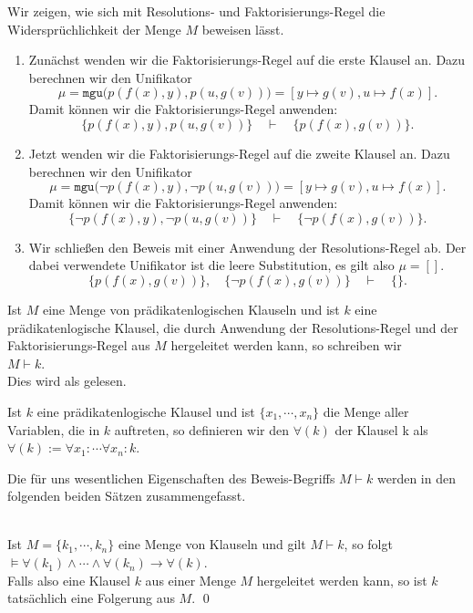 \noindent
Wir zeigen, wie sich mit Resolutions- und Faktorisierungs-Regel die Widersprüchlichkeit
der Menge $M$ beweisen lässt.
\begin{enumerate}
\item Zunächst wenden wir die Faktorisierungs-Regel auf die erste Klausel an. 
      Dazu berechnen wir den Unifikator 
      \[ \mu = \mathtt{mgu}\bigl(p(f(x),y), p(u,g(v))\bigr) = [y \mapsto g(v), u \mapsto f(x)]. \]
      Damit können wir die Faktorisierungs-Regel anwenden: 
      \[ \bigl\{p(f(x),y), p(u,g(v))\bigr\} \quad \vdash \quad \bigl\{p(f(x),g(v))\bigr\}. \]
\item Jetzt wenden wir die Faktorisierungs-Regel auf die zweite Klausel an.
      Dazu berechnen wir  den Unifikator 
      \[ \mu = \mathtt{mgu}\bigl(\neg p(f(x),y), \neg p(u,g(v))\bigr) = [y \mapsto g(v), u \mapsto f(x)]. 
      \]
      Damit können wir die Faktorisierungs-Regel anwenden: 
      \[ \bigl\{ \neg p(f(x),y), \neg p(u,g(v))\bigr\} \quad \vdash \quad \bigl\{\neg p(f(x),g(v))\bigr\}.
      \]
\item Wir schließen den Beweis mit einer Anwendung der Resolutions-Regel ab.
      Der dabei verwendete Unifikator ist die leere Substitution, es gilt also $\mu = []$.      
      \[ \bigl\{p(f(x),g(v))\bigr\}, \quad \bigl\{\neg p(f(x),g(v))\bigr\} \quad \vdash \quad \{\}. \]
\end{enumerate}
Ist $M$ eine Menge von prädikatenlogischen Klauseln und ist $k$ eine prädikatenlogische
Klausel, die durch Anwendung der Resolutions-Regel und der Faktorisierungs-Regel aus $M$
hergeleitet werden kann, so schreiben wir \\[0.2cm]
\hspace*{1.3cm} $M \vdash k$.
\\[0.2cm]
Dies wird als  gelesen.

\begin{Definition}[Allabschluss]
  Ist $k$ eine prädikatenlogische Klausel und ist $\{x_1,\cdots,x_n\}$
  die Menge aller Variablen, die in $k$ auftreten, so definieren wir
  den   $\forall(k)$  der Klausel k als \\[0.2cm]
  \hspace*{1.3cm} $\forall(k) := \forall x_1\colon \cdots \forall x_n \colon k$. \eox
\end{Definition}

\noindent
Die für uns wesentlichen Eigenschaften des Beweis-Begriffs $M \vdash k$ werden in den folgenden
beiden Sätzen zusammengefasst.
\begin{Satz} \hspace*{\fill} \\
    Ist $M = \{k_1,\cdots,k_n\}$ eine Menge von Klauseln und gilt $M \vdash k$, so folgt \\[0.2cm]
    \hspace*{1.3cm} $\models \forall(k_1) \wedge \cdots \wedge \forall(k_n) \rightarrow \forall(k)$. \\[0.2cm]
    Falls also eine Klausel $k$ aus einer Menge $M$ hergeleitet werden kann,
    so ist $k$ tatsächlich eine Folgerung aus $M$. \qed
\end{Satz}

